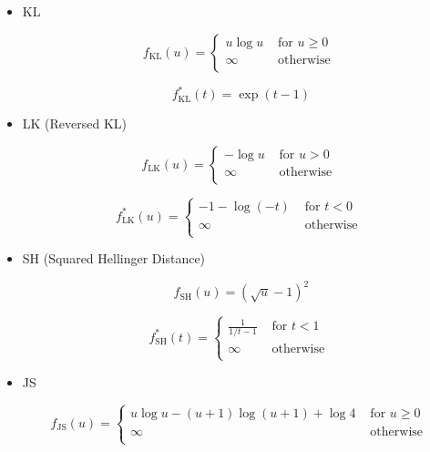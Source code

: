 \documentclass{report}
\begin{document}
\begin{example}
    \begin{itemize}
        \item
        KL

        $$
        f_{\mathrm{KL}}(u)=
        \begin{cases}
        u \log u & \text { for } u \geq 0 \\
        \infty & \text { otherwise } \\
        \end{cases}
        $$

        $$
        f_{\mathrm{KL}}^{*}(t)=\exp(t-1)
        $$
        \item
        LK (Reversed KL)

        $$
        f_{\mathrm{LK}}(u)=
        \begin{cases}
        - 
            \log u & \text { for } u > 0 \\
        \infty & \text { otherwise } \\
        \end{cases}
        $$

        $$
        f_{\mathrm{LK}}^{*}(u)=
        \begin{cases}
        -1-\log(-t) & \text { for } t < 0 \\
        \infty & \text { otherwise } \\
        \end{cases}
        $$
        \item
        SH (Squared Hellinger Distance)

        $$
        f_{\mathrm{SH}}(u)=(\sqrt{u}-1)^2
        $$

        $$
        f_{\mathrm{SH}}^{*}(t)=
        \begin{cases}
        \frac{1}{1/t-1} & \text { for } t < 1 \\
        \infty & \text { otherwise } \\
        \end{cases}
        $$
        \item
        JS

        $$
        f_{\mathrm{JS}}(u)=
        \begin{cases}
        u\log u-(u+1) \log (u+1)+\log 4 & \text { for } u \geq 0 \\
        \infty & \text { otherwise } \\
        \end{cases}
        $$


\end{itemize}
\end{example}
\end{document}
